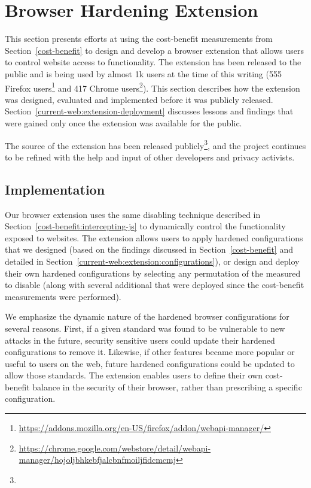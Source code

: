 \section{Browser Hardening Extension}
\label{current-web:extension}

This section presents efforts at using the cost-benefit measurements from
Section~\ref{cost-benefit} to design and develop a browser extension that
allows users to control website access to \WAPI functionality.  The extension
has been released to the public and is being used by almost 1k users at the
time of this writing (555 Firefox
users\footnote{\url{https://addons.mozilla.org/en-US/firefox/addon/webapi-manager/}}
and 417 Chrome
users\footnote{\url{https://chrome.google.com/webstore/detail/webapi-manager/hojoljbhkebfjalcbnfmoiljfidcmcmj}}).
This section describes how the extension was designed, evaluated and
implemented before it was publicly released.
Section~\ref{current-web:extension-deployment} discusses lessons and findings
that were gained only once the extension was available for the public.

The source of the extension has been released publicly\footnote{\ExtensionSourceUrl},
and the project continues to be refined with the help and input of other
developers and privacy activists.


\subsection{Implementation}
Our browser extension uses the same \WAS disabling technique described in
Section~\ref{cost-benefit:intercepting-js} to dynamically control the \WAPI
functionality exposed to websites.  The extension allows users to
apply hardened configurations that we designed (based on the findings
discussed in Section~\ref{cost-benefit} and detailed in
Section~\ref{current-web:extension:configurations}), or design and deploy
their own hardened configurations by selecting any permutation of the
measured \WASs to disable (along with several additional \WASs that were deployed
since the cost-benefit measurements were performed).

We emphasize the dynamic nature of the hardened browser configurations for
several reasons.  First, if a given standard was found to be vulnerable to new
attacks in the future, security sensitive users could update their hardened
configurations to remove it.  Likewise, if other features became more popular
or useful to users on the web, future hardened configurations could be updated
to allow those standards.  The extension enables users to define their own
cost-benefit balance in the security of their browser, rather than prescribing
a specific configuration.

